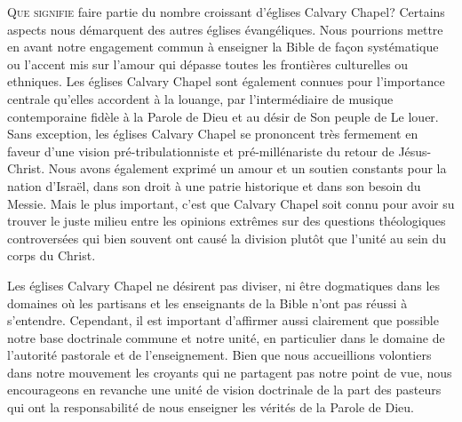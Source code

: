 
\begin{specialpar}{}
\lettrine{Q}{ue signifie} faire partie du nombre \pocketlinebreak
 croissant d'églises Calvary Chapel?
 Certains aspects nous démarquent des autres églises évangéliques.
 Nous pourrions mettre en avant notre engagement commun à enseigner la Bible
 de façon systématique ou l'accent mis sur l'amour qui dépasse
 toutes les frontières culturelles ou ethniques.
Les églises Calvary Chapel sont également connues pour l'importance centrale
 qu'elles accordent à la louange, par l'intermédiaire de musique con\-tem\-po\-rai\-ne
 fidèle à la Parole de Dieu et au désir de Son peuple de Le louer.
 Sans exception, les églises Calvary Chapel se prononcent très fermement
 en faveur d'une vision pré-tribulationniste et pré-millénariste du retour de Jésus-Christ.
Nous avons également exprimé un amour et un soutien constants pour la nation
 d'Israël,
 dans son droit à une patrie historique et dans son besoin du Messie.
 Mais le plus important, c'est que Calvary Chapel soit connu pour avoir su trouver
 le juste milieu entre les opinions extrêmes sur des questions théologiques
 controversées qui bien souvent ont causé la division plutôt que l'unité
 au sein du corps du Christ.
\end{specialpar}

\begin{specialpar}{}
Les églises Calvary Chapel ne désirent pas diviser, ni être dogmatiques
 dans les domaines où les partisans et les enseignants de la Bible
 n'ont pas réussi à s'entendre.
 Cependant, il est important d'affirmer aussi clairement que possible
 notre base doctrinale commune et notre unité, en particulier dans le domaine
 de l'autorité pastorale et de l'enseignement. Bien que nous accueillions
 volontiers dans notre mouvement les croyants qui ne partagent pas notre point de vue,
 nous encourageons en revanche une unité de vision doctrinale de la part des pasteurs
 qui ont la responsabilité de nous enseigner les vérités de la Parole de Dieu.
\end{specialpar}


